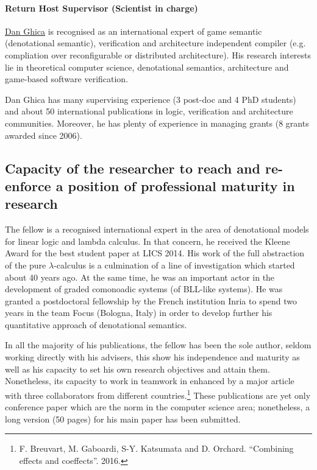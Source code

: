 \documentclass{article}[11pt]
\begin{document}
\paragraph{Return Host Supervisor (Scientist in charge)}
\href{http://www.cs.bham.ac.uk/~drg/}{Dan Ghica} is recognised as an international expert of game semantic (denotational semantic), verification and architecture independent compiler (e.g. compliation over reconfigurable or distributed architecture). His research interests lie in theoretical computer science, denotational semantics, architecture and game-based software verification.

Dan Ghica has many supervising experience (3 post-doc and 4 PhD students) and about 50 international publications in logic, verification and architecture communities. Moreover, he has plenty of experience in managing grants (8 grants awarded since 2006).


\subsection{Capacity of the researcher to reach and re-enforce a position of professional maturity in research}

The fellow is a recognised international expert in the area of denotational models for linear logic and lambda calculus. In that concern, he received the Kleene Award for the best student paper at LICS 2014. His work of the full abstraction of the pure $\lambda$-calculus is a culmination of a line of investigation which started about 40 years ago. At the same time, he was an important actor in the development of graded comonoadic systems (of BLL-like systems). He was granted a postdoctoral fellowship by the French institution Inria to spend two years in the team Focus (Bologna, Italy) in order to develop further his quantitative approach of denotational semantics.

In all the majority of his publications, the fellow has been the sole author, seldom working directly with his advisers, this show his independence and maturity as well as his capacity to set his own research objectives and attain them. Nonetheless, its capacity to work in teamwork in enhanced by a major article with three collaborators from different countries.\footnote{F. Breuvart, M. Gaboardi, S-Y. Katsumata and D. Orchard. ``Combining effects and coeffects''. 2016.} These publications are yet only conference paper which are the norm in the computer science area; nonetheless, a long version (50 pages) for his main paper has been submitted.
\end{document}
